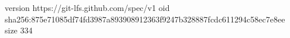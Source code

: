 version https://git-lfs.github.com/spec/v1
oid sha256:875e71085df74fd3987a893908912363f9247b328887fcdc611294c58ec7e8ee
size 334
